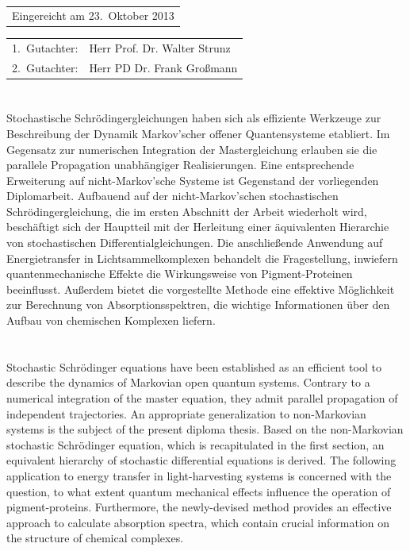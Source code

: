 \newpage
\thispagestyle{empty}
\ \vfill
\begin{tabular}{l}
Eingereicht am 23.~Oktober 2013
\end{tabular}

\vspace{1cm}

\begin{tabular}{ll}
1.~Gutachter: & Herr Prof. Dr. Walter Strunz\\
2.~Gutachter: & Herr PD Dr. Frank Großmann\\
\end{tabular}

\newpage
\thispagestyle{empty}
\section*{}

Stochastische Schrödingergleichungen haben sich als effiziente Werkzeuge zur Beschreibung der Dynamik Markov'scher offener Quantensysteme etabliert.
Im Gegensatz zur numerischen Integration der Mastergleichung erlauben sie die parallele Propagation unabhängiger Realisierungen.
Eine entsprechende Erweiterung auf nicht-Markov'sche Systeme ist Gegenstand der vorliegenden Diplomarbeit.
Aufbauend auf der nicht-Markov'schen stochastischen Schrödingergleichung, die im ersten Abschnitt der Arbeit wiederholt wird, beschäftigt sich der Hauptteil mit der Herleitung einer äquivalenten Hierarchie von stochastischen Differentialgleichungen.
Die anschließende Anwendung auf Energietransfer in Lichtsammelkomplexen behandelt die Fragestellung, inwiefern quantenmechanische Effekte die Wirkungsweise von Pigment-Proteinen beeinflusst.
Außerdem bietet die vorgestellte Methode eine effektive Möglichkeit zur Berechnung von Absorptionsspektren, die wichtige Informationen über den Aufbau von chemischen Komplexen liefern.
\bigskip

\section*{}
Stochastic Schrödinger equations have been established as an efficient tool to describe the dynamics of Markovian open quantum systems.
Contrary to a numerical integration of the master equation, they admit parallel propagation of independent trajectories.
An appropriate generalization to non-Markovian systems is the subject of the present diploma thesis.
Based on the non-Markovian stochastic Schrödinger equation, which is recapitulated in the first section, an equivalent hierarchy of stochastic differential equations is derived.
The following application to energy transfer in light-harvesting systems is concerned with the question, to what extent quantum mechanical effects influence the operation of pigment-proteins.
Furthermore, the newly-devised method provides an effective approach to calculate absorption spectra, which contain crucial information on the structure of chemical complexes.

\tableofcontents
